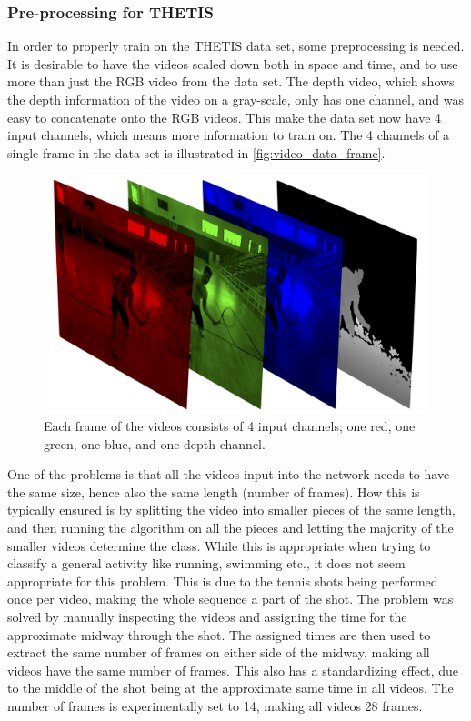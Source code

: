 \subsubsection{Pre-processing for THETIS}
In order to properly train on the THETIS data set, some preprocessing is needed. It is desirable to have the videos scaled down both in space and time, and to use more than just the RGB video from the data set. The depth video, which shows the depth information of the video on a gray-scale, only has one channel, and was easy to concatenate onto the RGB videos. This make the data set now have 4 input channels, which means more information to train on. The 4 channels of a single frame in the data set is illustrated in \autoref{fig:video_data_frame}. 
\begin{figure}
    \centering
    \includegraphics[width=.9\linewidth]{Pics/04_Data/RGBD.png}
    \caption{Each frame of the videos consists of 4 input channels; one red, one green, one blue, and one depth channel.}
    \label{fig:video_data_frame}
\end{figure}

One of the problems is that all the videos input into the network needs to have the same size, hence also the same length (number of frames). How this is typically ensured is by splitting the video into smaller pieces of the same length, and then running the algorithm on all the pieces and letting the majority of the smaller videos determine the class.\cite{Karpathy2014} While this is appropriate when trying to classify a general activity like running, swimming etc., it does not seem appropriate for this problem. This is due to the tennis shots being performed once per video, making the whole sequence a part of the shot. The problem was solved by manually inspecting the videos and assigning the time for the approximate midway through the shot. The assigned times are then used to extract the same number of frames on either side of the midway, making all videos have the same number of frames. This also has a standardizing effect, due to the middle of the shot being at the approximate same time in all videos. The number of frames is experimentally set to 14, making all videos 28 frames.

